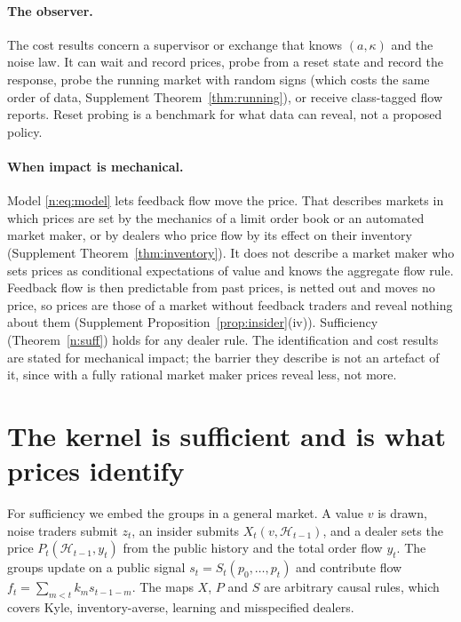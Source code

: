 \paragraph{The observer.} The cost results concern a supervisor or exchange that knows $(a,\kappa)$ and the noise law. It can wait and record prices, probe from a reset state and record the response, probe the running market with random signs (which costs the same order of data, Supplement Theorem~\ref{thm:running}), or receive class-tagged flow reports. Reset probing is a benchmark for what data can reveal, not a proposed policy.

\paragraph{When impact is mechanical.} Model \eqref{n:eq:model} lets feedback flow move the price. That describes markets in which prices are set by the mechanics of a limit order book or an automated market maker, or by dealers who price flow by its effect on their inventory (Supplement Theorem~\ref{thm:inventory}). It does not describe a market maker who sets prices as conditional expectations of value and knows the aggregate flow rule. Feedback flow is then predictable from past prices, is netted out and moves no price, so prices are those of a market without feedback traders and reveal nothing about them (Supplement Proposition~\ref{prop:insider}(iv)). Sufficiency (Theorem~\ref{n:suff}) holds for any dealer rule. The identification and cost results are stated for mechanical impact; the barrier they describe is not an artefact of it, since with a fully rational market maker prices reveal less, not more.

\section{The kernel is sufficient and is what prices identify}\label{n:suff_sec}

For sufficiency we embed the groups in a general market. A value $v$ is drawn, noise traders submit $z_t$, an insider submits $X_t(v,\mathcal H_{t-1})$, and a dealer sets the price $P_t(\mathcal H_{t-1},y_t)$ from the public history and the total order flow $y_t$. The groups update on a public signal $s_t=S_t(p_0,\ldots,p_t)$ and contribute flow $f_t=\sum_{m<t}k_ms_{t-1-m}$. The maps $X$, $P$ and $S$ are arbitrary causal rules, which covers Kyle, inventory-averse, learning and misspecified dealers.

